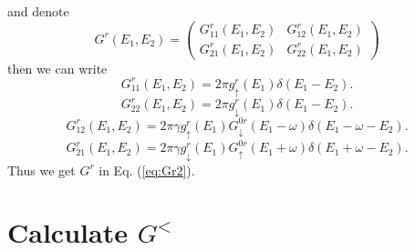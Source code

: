 \documentclass[11pt,a4paper]{article}
\begin{document}
and denote
\begin{equation}
G^{r}(E_{1},E_{2})=\left(\begin{array}{cc}
G_{11}^{r}(E_{1},E_{2}) & G_{12}^{r}(E_{1},E_{2}) \\
G_{21}^{r}(E_{1},E_{2}) & G_{22}^{r}(E_{1},E_{2})
\end{array}\right)
\end{equation}
then we can write
\begin{equation}
G_{11}^{r}(E_{1},E_{2}) = 2\pi g_{\uparrow}^{r}(E_{1}) \delta(E_{1}-E_{2}).
\end{equation}
\begin{equation}
G_{22}^{r}(E_{1},E_{2}) = 2\pi g_{\downarrow}^{r}(E_{1}) \delta(E_{1}-E_{2}).
\end{equation}
\begin{equation}
G_{12}^{r}(E_{1},E_{2}) = 2\pi \gamma g_{\uparrow}^{r}(E_{1}) G_{\downarrow}^{0r}(E_{1}-\omega) \delta(E_{1}-\omega-E_{2}).
\end{equation}
\begin{equation}
G_{21}^{r}(E_{1},E_{2}) = 2\pi\gamma g_{\downarrow}^{r}(E_{1}) G_{\uparrow}^{0r}(E_{1}+\omega) \delta(E_{1}+\omega-E_{2}).
\end{equation}
Thus we get $G^{r}$ in Eq. (\ref{eq:Gr2}).
\section{Calculate $G^{<}$}
\end{document}
